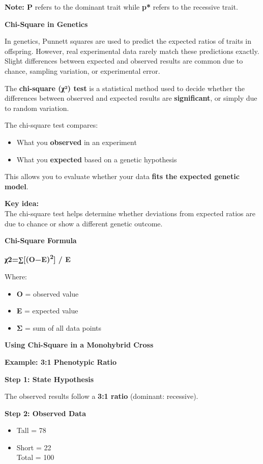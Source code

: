 \documentclass[
  letterpaper,
  DIV=11,
  numbers=noendperiod]{scrreprt}
\begin{document}
\textbf{Note: P} refers to the dominant trait while \textbf{p*} refers
to the recessive trait.

\textbf{Chi-Square in Genetics}

In genetics, Punnett squares are used to predict the expected ratios of
traits in offspring. However, real experimental data rarely match these
predictions exactly. Slight differences between expected and observed
results are common due to chance, sampling variation, or experimental
error.

The \textbf{chi-square (χ²) test} is a statistical method used to decide
whether the differences between observed and expected results are
\textbf{significant}, or simply due to random variation.

The chi-square test compares:

\begin{itemize}
\item
  What you \textbf{observed} in an experiment
\item
  What you \textbf{expected} based on a genetic hypothesis
\end{itemize}

This allows you to evaluate whether your data \textbf{fits the expected
genetic model}.

\textbf{Key idea:}\\
The chi-square test helps determine whether deviations from expected
ratios are due to chance or show a different genetic outcome.

\textbf{Chi-Square Formula}

\textbf{χ2=∑{[}(O−E)\textsuperscript{2}{]} / E}

Where:

\begin{itemize}
\item
  \textbf{O} = observed value
\item
  \textbf{E} = expected value
\item
  \textbf{Σ} = sum of all data points
\end{itemize}

\textbf{Using Chi-Square in a Monohybrid Cross}

\textbf{Example: 3:1 Phenotypic Ratio}

\textbf{Step 1: State Hypothesis}

The observed results follow a \textbf{3:1 ratio} (dominant: recessive).

\textbf{Step 2: Observed Data}

\begin{itemize}
\item
  Tall = 78
\item
  Short = 22\\
  Total = 100
\end{itemize}
\end{document}
